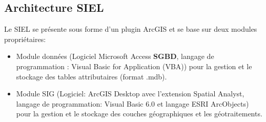 %
%
%
%


\subsection{Architecture SIEL}

Le SIEL se présente sous forme d'un plugin ArcGIS et se base sur deux modules propriétaires:\\

\begin{itemize}
\item Module données (Logiciel Microsoft Access \textbf{SGBD}, langage de programmation : Visual Basic for Application (VBA)) pour la gestion et le stockage des tables attributaires (format .mdb).
\item Module SIG (Logiciel: ArcGIS Desktop avec l'extension Spatial Analyst, langage de programmation: Visual Basic 6.0 et langage ESRI ArcObjects) pour la gestion et le stockage des couches géographiques et les géotraitements.\\
\end{itemize}

